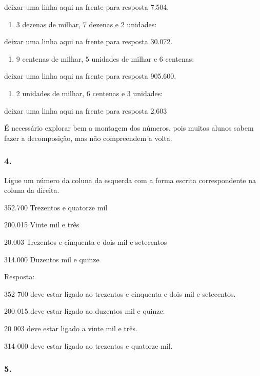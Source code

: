 \begin{enumerate}
deixar uma linha aqui na frente para resposta
7.504.

\begin{enumerate}
\def\labelenumi{\alph{enumi})}
\item
  3 dezenas de milhar, 7 dezenas e 2 unidades:
\end{enumerate}

deixar uma linha aqui na frente para resposta
30.072.

\begin{enumerate}
\def\labelenumi{\alph{enumi})}
\item
  9 centenas de milhar, 5 unidades de milhar e 6 centenas:
\end{enumerate}

deixar uma linha aqui na frente para resposta
905.600.

\begin{enumerate}
\def\labelenumi{\alph{enumi})}
\item
  2 unidades de milhar, 6 centenas e 3 unidades:
\end{enumerate}

deixar uma linha aqui na frente para resposta
2.603

É necessário explorar bem a montagem dos números, pois muitos alunos sabem fazer a decomposição, mas não compreendem a volta.

\subsubsection{4.}\label{section-3}

Ligue um número da coluna da esquerda com a forma escrita correspondente na coluna da direita.

352.700 Trezentos e quatorze mil

200.015 Vinte mil e três

20.003 Trezentos e cinquenta e dois mil e setecentos

314.000 Duzentos mil e quinze

Resposta:

352 700 deve estar ligado ao trezentos e cinquenta e dois mil e
setecentos.

200 015 deve estar ligado ao duzentos mil e quinze.

20 003 deve estar ligado a vinte mil e três.

314 000 deve estar ligado ao trezentos e quatorze mil.

\subsubsection{5.}\label{section-4}


\end{enumerate}
